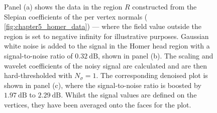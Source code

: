 \begin{figure}[htpb]
	\centering\capstart{}
	\hfill
	\hfill
	\caption[
		A denoising demonstration for a field on the Homer mesh
	]{
		Panel (a) shows the data in the region \(R\) constructed from the Slepian coefficients of the per vertex normals (\cf{} \cref{fig:chapter5_homer_data}) --- where the field value outside the region is set to negative infinity for illustrative purposes.
		Gaussian white noise is added to the signal in the Homer head region with a signal-to-noise ratio of \(\SI{0.32}{\dB}\), shown in panel (b).
		The scaling and wavelet coefficients of the noisy signal are calculated and are then hard-thresholded with \(N_{\sigma}=1\).
		The corresponding denoised plot is shown in panel (c), where the signal-to-noise ratio is boosted by \(\SI{1.97}{\dB}\) to \(\SI{2.29}{\dB}\).
		Whilst the signal values are defined on the vertices, they have been averaged onto the faces for the plot.
	}\label{fig:chapter5_denoising}
\end{figure}
